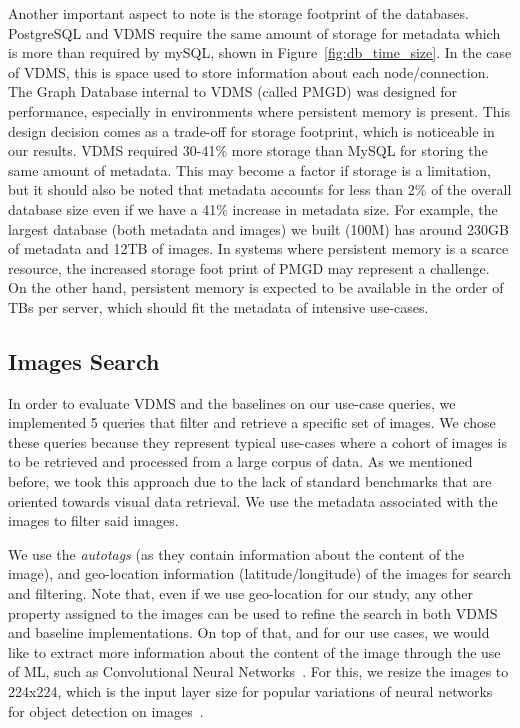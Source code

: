Another important aspect to note is the storage footprint of the databases.
PostgreSQL and VDMS require the same amount of storage for metadata which
is more than required by mySQL, shown in Figure~\ref{fig:db_time_size}. In the case of VDMS,
this is space used to store information about each node/connection.
The Graph Database internal to VDMS (called PMGD) was designed for performance,
especially in environments where persistent memory is present.
This design decision comes as a trade-off for storage footprint, which is
noticeable in our results.
VDMS required 30-41\% more storage than MySQL for storing the same amount
of metadata.
This may become a factor if storage is a limitation, but it should also be noted
that metadata accounts for less than 2\% of the overall database size
even if we have a 41\% increase in metadata size.
For example, the largest database (both metadata and images) we built
(100M) has around 230GB of metadata and 12TB of images.
In systems where persistent memory is a scarce resource,
the increased storage foot print of PMGD may represent a challenge.
On the other hand, persistent memory is expected to be available
in the order of TBs per server, which should fit the
metadata of intensive use-cases\cite{IntelXPoint15}.


\subsection{Images Search}
\label{images}

In order to evaluate VDMS and the baselines on our use-case queries,
we implemented 5 queries that filter and retrieve a specific set of images.
We chose these queries because they represent typical use-cases where a
cohort of images is to be retrieved and processed from a large corpus of data.
As we mentioned before, we took this approach due to the lack of standard
benchmarks that are oriented towards visual data retrieval.
We use the metadata associated with the images to filter said images.

We use the \textit{autotags} (as they contain information about the content
of the image), and geo-location information (latitude/longitude)
of the images for search and filtering.
Note that, even if we use geo-location for our study, any other property
assigned to the images can be used to refine the search
in both VDMS and baseline implementations.
On top of that, and for our use cases, we would like to extract more information
about the content of the image through the use of ML,
such as Convolutional Neural Networks~\cite{cnn}.
For this, we resize the images to 224x224, which is the input layer size for
popular variations of neural networks for object detection on images~\cite{resnet}.

